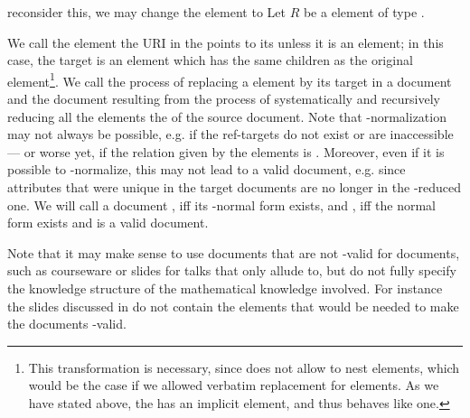\begin{omgroup}[id=omdoc-infrastructure,short=Document Infrastructure]
\begin{module}[id=sharing]
\begin{omgroup}[id=sharing,short=Sharing Document Parts]
\begin{oldpart}{reconsider this, we may change the {} element to
    {}}
  Let $R$ be a {} element of type {}.
  \begin{definition}[display=flow,id=ref-target.def]
    We call the element the URI in the {} points to its
     unless it is an {} element; in this case, the
    target is an {} element which has the same children as the original
    {} element\footnote{This transformation is necessary, since {\omdoc}
      does not allow to nest {} elements, which would be the case if we
      allowed verbatim replacement for {} elements. As we have stated
      above, the {} has an implicit {} element, and thus
      behaves like one.}.  We call the process of replacing a {} element by
    its target in a document  and the document resulting from the
    process of systematically and recursively reducing all the {} elements
    the  of the source document. Note that
    {}-normalization may not always be possible, e.g.  if the ref-targets do
    not exist or are inaccessible --- or worse yet, if the relation given by the
    {} elements is {}. Moreover, even if it is possible to
    {}-normalize, this may not lead to a valid {\omdoc} document, e.g.  since
     attributes that were unique in the target
    documents are no longer in the {}-reduced one. We will call a document
    , iff its {}-normal form exists, and
    , iff the {} normal form exists and is a valid {\omdoc}
    document.
  \end{definition}
\end{oldpart}
  
Note that it may make sense to use documents that are not {}-valid for
{} documents, such as courseware or slides for talks that
only allude to, but do not fully specify the knowledge structure of the mathematical
knowledge involved. For instance the slides discussed in {}
do not contain the {} elements that would be needed to make the documents
{}-valid.


\end{omgroup}
\end{module}
\end{omgroup}
